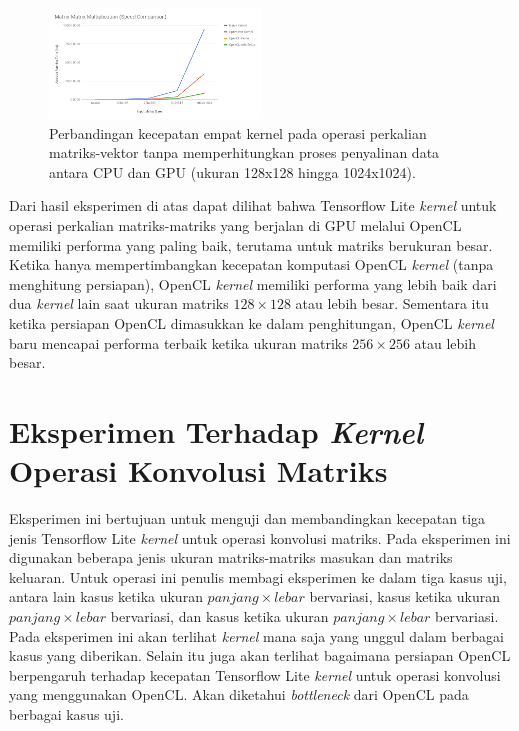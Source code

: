 \begin{figure}
	\centering
	\includegraphics[width=0.50\textwidth]
	{pics/matmatmul.png}
	\caption{Perbandingan kecepatan empat kernel pada operasi perkalian matriks-vektor tanpa memperhitungkan proses penyalinan data antara CPU dan GPU (ukuran 128x128 hingga 1024x1024).}
	\label{fig:matmatmul}
\end{figure}

Dari hasil eksperimen di atas dapat dilihat bahwa Tensorflow Lite \textit{kernel} untuk operasi perkalian matriks-matriks yang berjalan di GPU melalui OpenCL memiliki performa yang paling baik, terutama untuk matriks berukuran besar. Ketika hanya mempertimbangkan kecepatan komputasi OpenCL \textit{kernel} (tanpa menghitung persiapan), OpenCL \textit{kernel} memiliki performa yang lebih baik dari dua \textit{kernel} lain saat ukuran matriks $128 \times 128$ atau lebih besar. Sementara itu ketika persiapan OpenCL dimasukkan ke dalam penghitungan, OpenCL \textit{kernel} baru mencapai performa terbaik ketika ukuran matriks $256 \times 256$ atau lebih besar.

\section{Eksperimen Terhadap \textit{Kernel} Operasi Konvolusi Matriks }
Eksperimen ini bertujuan untuk menguji dan membandingkan kecepatan tiga jenis Tensorflow Lite \textit{kernel} untuk operasi konvolusi matriks. Pada eksperimen ini digunakan beberapa jenis ukuran matriks-matriks masukan dan matriks keluaran. Untuk operasi ini penulis membagi eksperimen ke dalam tiga kasus uji, antara lain kasus ketika ukuran $panjang \times lebar$ bervariasi, kasus ketika ukuran $panjang \times lebar$ bervariasi, dan kasus ketika ukuran $panjang \times lebar$ bervariasi. Pada eksperimen ini akan terlihat \textit{kernel} mana saja yang unggul dalam berbagai kasus yang diberikan. Selain itu juga akan terlihat bagaimana persiapan OpenCL berpengaruh terhadap kecepatan Tensorflow Lite \textit{kernel} untuk operasi konvolusi yang menggunakan OpenCL. Akan diketahui \textit{bottleneck} dari OpenCL pada berbagai kasus uji.

